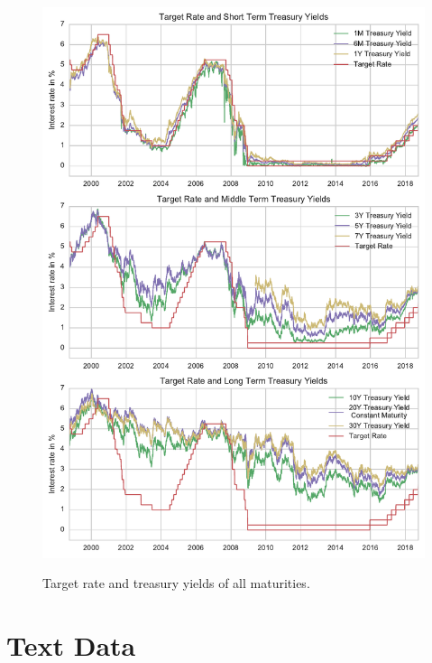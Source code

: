 \documentclass[11pt,a4paper,english,oneside]{book}
\numberwithin{equation}{chapter}
\begin{document}
\begin{figure}
	\caption{Target rate and treasury yields of all maturities.}
	\centering
	\includegraphics[scale=1]{Images/alltreasury.pdf}
	\label{alltreasury}
\end{figure}


\renewcommand{\theequation}{B.\arabic{equation}}


\chapter{Text Data}\label{AppendixB}

\end{document}
